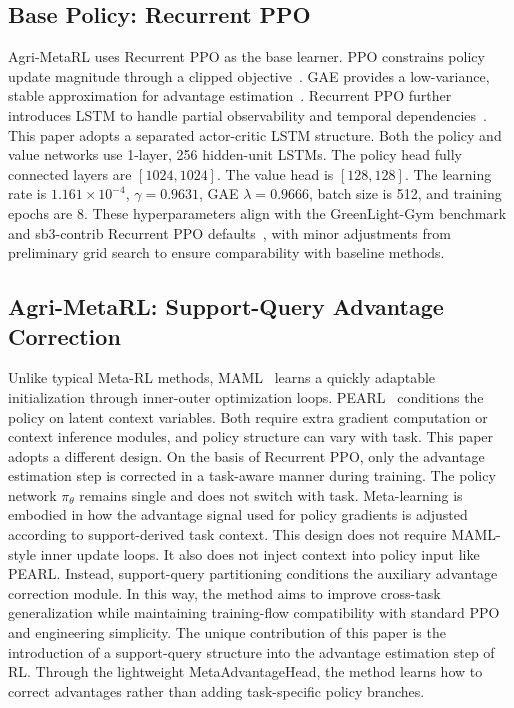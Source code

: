 \documentclass[number,preprint,review,12pt]{elsarticle}
\begin{document}
\subsection{Base Policy: Recurrent PPO}
Agri-MetaRL uses Recurrent PPO as the base learner. PPO constrains policy update magnitude through a clipped objective~\cite{schulman2015trpo,schulman2017proximal}. GAE provides a low-variance, stable approximation for advantage estimation~\cite{schulman2015high}. Recurrent PPO further introduces LSTM to handle partial observability and temporal dependencies~\cite{ni2022recurrent,recurrentppo,hausknecht2015drqn,pleines2022recurrent}. This paper adopts a separated actor-critic LSTM structure. Both the policy and value networks use 1-layer, 256 hidden-unit LSTMs. The policy head fully connected layers are $[1024,1024]$. The value head is $[128,128]$. The learning rate is $1.161\times10^{-4}$, $\gamma=0.9631$, GAE $\lambda=0.9666$, batch size is 512, and training epochs are 8. These hyperparameters align with the GreenLight-Gym benchmark and sb3-contrib Recurrent PPO defaults~\cite{morcego2023reinforcement,van2025greenlight}, with minor adjustments from preliminary grid search to ensure comparability with baseline methods.

\subsection{Agri-MetaRL: Support-Query Advantage Correction}
Unlike typical Meta-RL methods, MAML~\cite{finn2017maml} learns a quickly adaptable initialization through inner-outer optimization loops. PEARL~\cite{rakelly2019pearl} conditions the policy on latent context variables. Both require extra gradient computation or context inference modules, and policy structure can vary with task. This paper adopts a different design. On the basis of Recurrent PPO, only the advantage estimation step is corrected in a task-aware manner during training. The policy network $\pi_{\theta}$ remains single and does not switch with task. Meta-learning is embodied in how the advantage signal used for policy gradients is adjusted according to support-derived task context. This design does not require MAML-style inner update loops. It also does not inject context into policy input like PEARL. Instead, support-query partitioning conditions the auxiliary advantage correction module. In this way, the method aims to improve cross-task generalization while maintaining training-flow compatibility with standard PPO and engineering simplicity. The unique contribution of this paper is the introduction of a support-query structure into the advantage estimation step of RL. Through the lightweight MetaAdvantageHead, the method learns how to correct advantages rather than adding task-specific policy branches.
\end{document}
